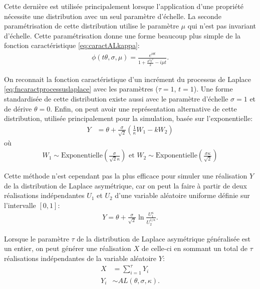 Cette dernière est utilisée principalement lorsque l'application d'une
propriété nécessite une distribution avec un seul paramètre d'échelle.
La seconde paramétrisation de cette distribution utilise le paramètre
$\mu$ qui n'est pas invariant d'échelle.  Cette paramétrisation donne
une forme beaucoup plus simple de la fonction caractéristique
\eqref{eq:caractALkappa}:
\begin{align}
  \label{eq:caractALmu}
  \phi(t\theta,\sigma,\mu) = \frac{e^{i \theta t}}{1+\frac{\sigma^2
      t^2}{2}- i\mu t}.
\end{align}

On reconnait la fonction caractéristique d'un incrément du processus
de Laplace \eqref{eq:fncaractprocessuslaplace} avec les paramètres
($\tau=1$, $t=1$). Une forme standardisée de cette distribution existe
aussi avec le paramètre d'échelle $\sigma=1$ et de dérive $\theta=0$.
Enfin, on peut avoir une représentation alternative de cette
distribution, utilisée principalement pour la simulation, basée sur
l'exponentielle:
\begin{align}
  \label{eq:ALrepsimul}
  Y &= \theta + \frac{\sigma}{\sqrt{2}} \left(\frac{1}{\kappa}W_1 - k W_2 \right)
\end{align}
où
\begin{align*}
  W_1 \sim \mbox{Exponentielle}\left(\frac{\sigma}{\sqrt{2}\kappa}\right) \nonumber \mbox{ et } W_2 \sim \mbox{Exponentielle}\left(\frac{\sigma\kappa}{\sqrt{2}}\right)
\end{align*}

Cette méthode n'est cependant pas la plus efficace pour simuler une
réalisation $Y$ de la distribution de Laplace asymétrique, car on peut
la faire à partir de deux réalisations indépendantes $U_1$ et $U_2 $
d'une variable aléatoire uniforme définie sur l'intervalle
$\left[0,1\right]$:
\begin{align}
  \label{eq:simulALunif}
  Y = \theta + \frac{\sigma}{\sqrt{2}}
  \ln{\frac{U_1^\kappa}{U_2^{1/\kappa}}}.
\end{align}

Lorsque le paramètre $\tau$ de la distribution de Laplace asymétrique
généralisée est un entier, on peut générer une réalisation $X$ de
celle-ci en sommant un total de $\tau$ réalisations indépendantes de
la variable aléatoire $Y$:
\begin{align*}
  X &= \sum_{i=1}^{\tau} Y_{i} \\
  Y_{i} &\sim AL(\theta,\sigma,\kappa).
\end{align*}

